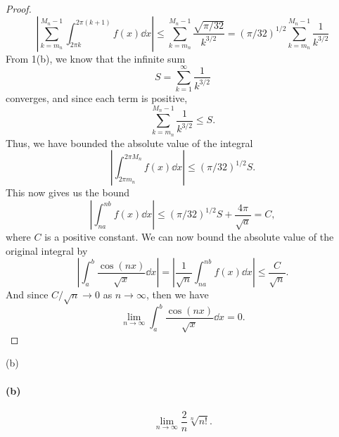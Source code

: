 \documentclass[12pt]{article}
\newenvironment{fullbox}{\begin{lrbox}{\savefullbox}\begin{minipage}{\dimexpr\textwidth-2\fboxsep\relax}}{\end{minipage}\end{lrbox}\begin{center}\framebox[\textwidth]{\usebox{\savefullbox}}\end{center}}
\newenvironment{pbox}[1][]{\begin{fullbox}\ifx#1\empty\else\paragraph{#1}\fi}{\end{fullbox}}
\theoremstyle{definition}
\begin{document}
\begin{proof}
    \[
        \left|\sum_{k=m_n}^{M_n-1} \int_{2\pi k}^{2\pi(k+1)} f(x) \dd{x}\right|
            \leq \sum_{k=m_n}^{M_n-1} \frac{\sqrt{\pi/32}}{k^{3/2}}
            = (\pi/32)^{1/2} \sum_{k=m_n}^{M_n-1} \frac{1}{k^{3/2}}
    \]
    From 1(b), we know that the infinite sum
    \[
        S = \sum_{k=1}^{\infty} \frac{1}{k^{3/2}}
    \]
    converges, and since each term is positive,
    \[
        \sum_{k=m_n}^{M_n-1} \frac{1}{k^{3/2}} \leq S.
    \]
    Thus, we have bounded the absolute value of the integral
    \[
        \left|\int_{2\pi m_n}^{2\pi M_n} f(x) \dd{x}\right| \leq (\pi/32)^{1/2}S.
    \]
    This now gives us the bound
    \[
        \left|\int_{na}^{nb} f(x) \dd{x}\right| \leq  (\pi/32)^{1/2}S + \frac{4\pi}{\sqrt{a}} = C,
    \]
    where $C$ is a positive constant. We can now bound the absolute value of the original integral by
    \[
        \left|\int_a^b \frac{\cos(nx)}{\sqrt{x}} \dd{x}\right|
            = \left| \frac{1}{\sqrt{n}} \int_{na}^{nb} f(x) \dd{x}\right|
            \leq \frac{C}{\sqrt{n}}.
    \]
    And since $C/\sqrt{n} \to 0$ as $n \to \infty$, then we have
    \[
        \lim_{n \to \infty} \int_a^b \frac{\cos(nx)}{\sqrt{x}} \dd{x}
            = 0.
    \]
    
    
    
\end{proof}



\newpage
\begin{pbox}[(b)]
    \begin{equation}
    \lim_{n\to\infty} \frac{2}{n} \sqrt[n]{n!}.
    \end{equation}
\end{pbox}
\end{document}
